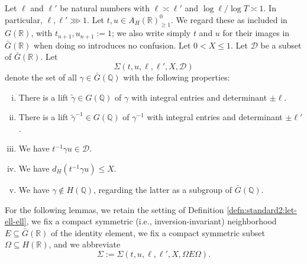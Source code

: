 \begin{definition}\label{defn:standard2:let-ell-ell}
  Let $\ell$ and $\ell '$ be natural numbers with $\ell \asymp \ell '$ and $\log \ell / \log T \asymp 1$.  In particular, $\ell, \ell ' \ggg 1$.  Let $t, u \in A_H(\mathbb{R})^0_{\geq 1}$.  We regard these as included in $G(\mathbb{R})$, with $t_{n+1}, u_{n+1} := 1$; we also write simply $t$ and $u$ for their images in $\bar{G}(\mathbb{R})$ when doing so introduces no confusion.  Let $0 < X \leq 1$.  Let $\mathcal{D}$ be a subset of $\bar{G}(\mathbb{R})$.  Let
  \begin{equation*}
    \Sigma(t, u, \ell, \ell', X, \mathcal{D})
  \end{equation*}
  denote the set of all $\gamma \in \bar{G}(\mathbb{Q})$ with the following properties:
  \begin{enumerate}[(i)]
  \item \label{itm:scratch-research:Sigma-count-1}
    There is a lift $\tilde{\gamma} \in G(\mathbb{Q})$ of $\gamma$ with integral entries and determinant $\pm \ell$.
  \item \label{itm:scratch-research:Sigma-count-2}
    There is a lift $\tilde{\gamma}^{-1} \in G(\mathbb{Q})$ of $\gamma^{-1}$ with integral entries and determinant $\pm \ell '$.
  \item \label{itm:scratch-research:Sigma-count-3} We have $t^{-1} \gamma u \in \mathcal{D}$.
  \item \label{itm:scratch-research:Sigma-count-4}  We have $d_H(t^{-1} \gamma u) \leq X$.
  \item \label{itm:scratch-research:Sigma-count-5} We have $\gamma \notin H(\mathbb{Q})$,  regarding the latter as a subgroup of $\bar{G}(\mathbb{Q})$.
  \end{enumerate}
\end{definition}

For the following lemmas, we retain the setting of Definition \ref{defn:standard2:let-ell-ell}, we fix a compact symmetric (i.e., inversion-invariant) neighborhood $E \subseteq \bar{G}(\mathbb{R})$ of the identity element, we fix a compact symmetric subset $\Omega \subseteq H(\mathbb{R})$, and we abbreviate
\begin{equation*}
  \Sigma := \Sigma(t,u,\ell, \ell', X, \Omega E \Omega).
\end{equation*}

